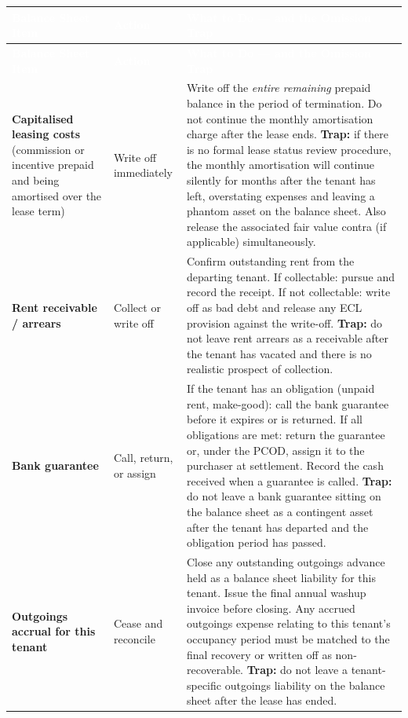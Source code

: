 \documentclass[10pt,a4paper]{article}
\begin{document}
{\small\sffamily
\begin{longtable}{@{} L{3.2cm} L{2.0cm} L{7.5cm} @{}}
\textcolor{white}{\bfseries Balance Sheet Item} & \textcolor{white}{\bfseries Action} & \textcolor{white}{\bfseries What to Do --- and the Omission Trap} \\
\midrule
\endfirsthead
{}\textcolor{white}{\bfseries Balance Sheet Item} & \textcolor{white}{\bfseries Action} & \textcolor{white}{\bfseries What to Do --- and the Omission Trap} \\
\midrule
\endhead
\textbf{Capitalised leasing costs} (commission or incentive prepaid and being amortised over the lease term) & Write off immediately & Write off the \emph{entire remaining} prepaid balance in the period of termination. Do not continue the monthly amortisation charge after the lease ends. \textbf{Trap:} if there is no formal lease status review procedure, the monthly amortisation will continue silently for months after the tenant has left, overstating expenses and leaving a phantom asset on the balance sheet. Also release the associated fair value contra (if applicable) simultaneously. \\
\textbf{Rent receivable / arrears} & Collect or write off & Confirm outstanding rent from the departing tenant. If collectable: pursue and record the receipt. If not collectable: write off as bad debt and release any ECL provision against the write-off. \textbf{Trap:} do not leave rent arrears as a receivable after the tenant has vacated and there is no realistic prospect of collection. \\
\textbf{Bank guarantee} & Call, return, or assign & If the tenant has an obligation (unpaid rent, make-good): call the bank guarantee before it expires or is returned. If all obligations are met: return the guarantee or, under the PCOD, assign it to the purchaser at settlement. Record the cash received when a guarantee is called. \textbf{Trap:} do not leave a bank guarantee sitting on the balance sheet as a contingent asset after the tenant has departed and the obligation period has passed. \\
\textbf{Outgoings accrual for this tenant} & Cease and reconcile & Close any outstanding outgoings advance held as a balance sheet liability for this tenant. Issue the final annual washup invoice before closing. Any accrued outgoings expense relating to this tenant's occupancy period must be matched to the final recovery or written off as non-recoverable. \textbf{Trap:} do not leave a tenant-specific outgoings liability on the balance sheet after the lease has ended. \\

\end{longtable}}
\end{document}
